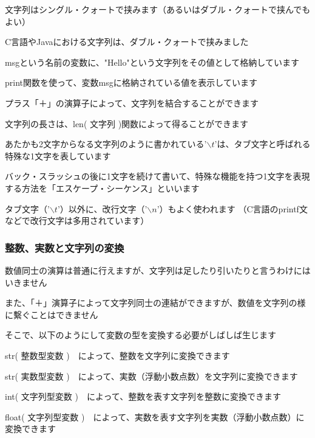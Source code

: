 \documentclass[uplatex,a4paper,11pt,oneside,openany]{jsbook}
\begin{document}


文字列はシングル・クォートで挟みます（あるいはダブル・クォートで挟んでもよい）

C言語やJavaにおける文字列は、ダブル・クォートで挟みました

msgという名前の変数に、"Hello"という文字列をその値として格納しています

print関数を使って、変数msgに格納されている値を表示しています

プラス「＋」の演算子によって、文字列を結合することができます

文字列の長さは、len( 文字列 )関数によって得ることができます


あたかも2文字からなる文字列のように書かれている'$\backslash t$'は、タブ文字と呼ばれる特殊な1文字を表しています

バック・スラッシュの後に1文字を続けて書いて、特殊な機能を持つ1文字を表現する方法を「エスケープ・シーケンス」といいます

タブ文字（'$\backslash t$'）以外に、改行文字（'$\backslash n$'）もよく使われます
（C言語のprintf文などで改行文字は多用されています）

\subsubsection{整数、実数と文字列の変換}

数値同士の演算は普通に行えますが、文字列は足したり引いたりと言うわけにはいきません

また、「＋」演算子によって文字列同士の連結ができますが、数値を文字列の様に繫ぐことはできません

そこで、以下のようにして変数の型を変換する必要がしばしば生じます

str( 整数型変数 )　によって、整数を文字列に変換できます

str( 実数型変数 )　によって、実数（浮動小数点数）を文字列に変換できます

int( 文字列型変数 )　によって、整数を表す文字列を整数に変換できます

float( 文字列型変数 )　によって、実数を表す文字列を実数（浮動小数点数）に変換できます


\end{document}
